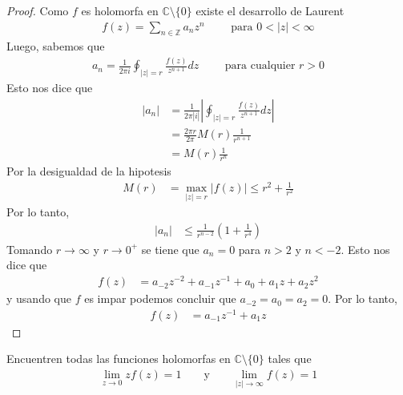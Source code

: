 \documentclass{article}
\newcommand{\Z}{\mathbb{Z}}
\newcommand{\C}{\mathbb{C}}
\newenvironment{theorem}[2][Ejercicio]{\begin{trivlist}
\item[\hskip\labelsep{\bfseries #1}\hskip\labelsep{\bfseries #2.}]}{\end{trivlist}}
\begin{document}
\begin{proof}
    Como \( f \) es holomorfa en \( \C \setminus \{ 0 \} \) existe el desarrollo de Laurent \begin{align*}
        f(z) = \sum_{n \in \Z} a_n z^n \qquad \text{ para } 0 < |z| < \infty
    \end{align*}
    Luego, sabemos que \begin{align*}
        a_n = \frac{1}{2 \pi i} \oint_{|z| = r} \frac{f(z)}{z^{n+1}} dz \qquad \text{ para cualquier } r > 0
    \end{align*}
    Esto nos dice que \begin{align*}
        |a_n| & = \frac{1}{2 \pi |i|} \left| \oint_{|z|=r} \frac{f(z)}{z^{n+1}} dz \right| \\
              & =\frac{2 \pi r}{2 \pi} M(r) \frac{1}{r^{n+1}}                              \\
              & = M(r) \frac{1}{r^n}
    \end{align*}
    Por la desigualdad de la hipotesis \begin{align*}
        M(r) & = \max_{|z|=r} |f(z)| \leq r^2 + \frac{1}{r^2}
    \end{align*}
    Por lo tanto, \begin{align*}
        |a_n| & \leq \frac{1}{r^{n-2}} \left( 1 + \frac{1}{r^4} \right)
    \end{align*}
    Tomando \( r \to \infty \) y \( r \to 0^{+} \) se tiene que \( a_n = 0 \) para \( n > 2 \) y \( n < -2 \). Esto nos dice que \begin{align*}
        f(z) & = a_{-2} z^{-2} + a_{-1} z^{-1} + a_0 + a_1 z + a_2 z^2
    \end{align*}
    y usando que \( f \) es impar podemos concluir que \( a_{-2} = a_0 = a_2 = 0 \). Por lo tanto, \begin{align*}
        f(z) & = a_{-1} z^{-1} + a_1 z
    \end{align*}
\end{proof}

\vspace{0.25in}

\begin{theorem}{14}
    Encuentren todas las funciones holomorfas en \( \C \setminus \{ 0 \} \) tales que \begin{align*}
        \lim_{z \to 0} z f(z) = 1 \qquad \text{y} \qquad \lim_{|z| \to \infty} f(z) = 1
    \end{align*}
\end{theorem}
\end{document}
